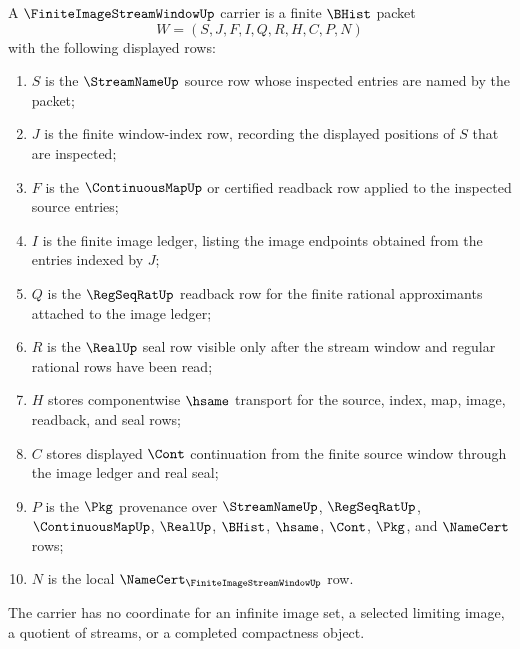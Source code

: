 \begin{definition}
\label{def:finite-image-stream-window-carrier}
A $\FiniteImageStreamWindowUp$ carrier is a finite $\BHist$ packet
$$
W=(S,J,F,I,Q,R,H,C,P,N)
$$
with the following displayed rows:
\begin{enumerate}
\item $S$ is the $\StreamNameUp$ source row whose inspected entries are named by the packet;
\item $J$ is the finite window-index row, recording the displayed positions of $S$ that are inspected;
\item $F$ is the $\ContinuousMapUp$ or certified readback row applied to the inspected source entries;
\item $I$ is the finite image ledger, listing the image endpoints obtained from the entries indexed by $J$;
\item $Q$ is the $\RegSeqRatUp$ readback row for the finite rational approximants attached to the image ledger;
\item $R$ is the $\RealUp$ seal row visible only after the stream window and regular rational rows have been read;
\item $H$ stores componentwise $\hsame$ transport for the source, index, map, image, readback, and seal rows;
\item $C$ stores displayed $\Cont$ continuation from the finite source window through the image ledger and real seal;
\item $P$ is the $\Pkg$ provenance over $\StreamNameUp$, $\RegSeqRatUp$, $\ContinuousMapUp$, $\RealUp$, $\BHist$, $\hsame$, $\Cont$, $\Pkg$, and $\NameCert$ rows;
\item $N$ is the local $\NameCert_{\FiniteImageStreamWindowUp}$ row.
\end{enumerate}
The carrier has no coordinate for an infinite image set, a selected limiting image, a quotient of streams, or a completed compactness object.
\end{definition}

